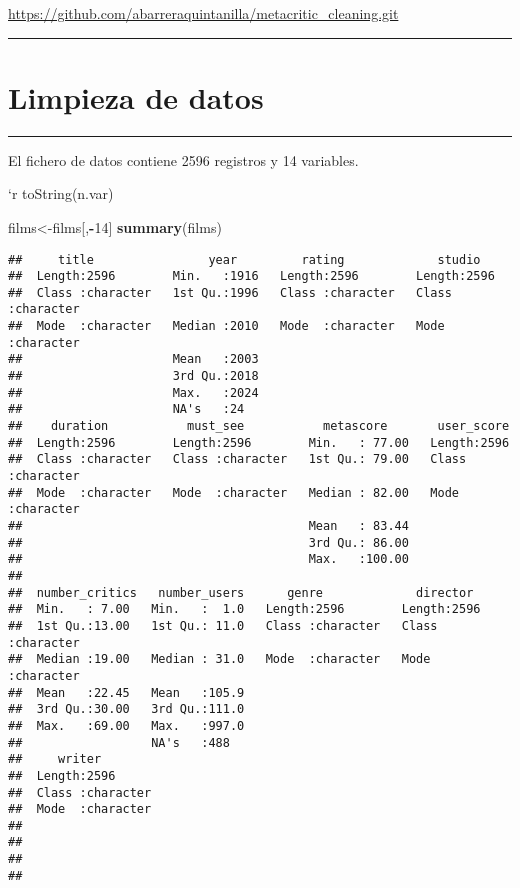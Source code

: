 \documentclass[
]{article}
\newenvironment{Shaded}{\begin{snugshade}}{\end{snugshade}}
\newcommand{\DecValTok}[1]{\textcolor[rgb]{0.00,0.00,0.81}{#1}}
\newcommand{\FunctionTok}[1]{\textcolor[rgb]{0.13,0.29,0.53}{\textbf{#1}}}
\newcommand{\NormalTok}[1]{#1}
\newcommand{\OtherTok}[1]{\textcolor[rgb]{0.56,0.35,0.01}{#1}}
\newcommand{\SpecialCharTok}[1]{\textcolor[rgb]{0.81,0.36,0.00}{\textbf{#1}}}
\begin{document}
\url{https://github.com/abarreraquintanilla/metacritic_cleaning.git}

\begin{center}\rule{0.5\linewidth}{0.5pt}\end{center}

\section{Limpieza de datos}\label{limpieza-de-datos}

\begin{center}\rule{0.5\linewidth}{0.5pt}\end{center}

El fichero de datos contiene 2596 registros y 14 variables.

`r toString(n.var)

\begin{Shaded}
\begin{Highlighting}[]
\NormalTok{films}\OtherTok{\textless{}{-}}\NormalTok{films[,}\SpecialCharTok{{-}}\DecValTok{14}\NormalTok{]}
\FunctionTok{summary}\NormalTok{(films)}
\end{Highlighting}
\end{Shaded}

\begin{verbatim}
##     title                year         rating             studio         
##  Length:2596        Min.   :1916   Length:2596        Length:2596       
##  Class :character   1st Qu.:1996   Class :character   Class :character  
##  Mode  :character   Median :2010   Mode  :character   Mode  :character  
##                     Mean   :2003                                        
##                     3rd Qu.:2018                                        
##                     Max.   :2024                                        
##                     NA's   :24                                          
##    duration           must_see           metascore       user_score       
##  Length:2596        Length:2596        Min.   : 77.00   Length:2596       
##  Class :character   Class :character   1st Qu.: 79.00   Class :character  
##  Mode  :character   Mode  :character   Median : 82.00   Mode  :character  
##                                        Mean   : 83.44                     
##                                        3rd Qu.: 86.00                     
##                                        Max.   :100.00                     
##                                                                           
##  number_critics   number_users      genre             director        
##  Min.   : 7.00   Min.   :  1.0   Length:2596        Length:2596       
##  1st Qu.:13.00   1st Qu.: 11.0   Class :character   Class :character  
##  Median :19.00   Median : 31.0   Mode  :character   Mode  :character  
##  Mean   :22.45   Mean   :105.9                                        
##  3rd Qu.:30.00   3rd Qu.:111.0                                        
##  Max.   :69.00   Max.   :997.0                                        
##                  NA's   :488                                          
##     writer         
##  Length:2596       
##  Class :character  
##  Mode  :character  
##                    
##                    
##                    
## 
\end{verbatim}
\end{document}
